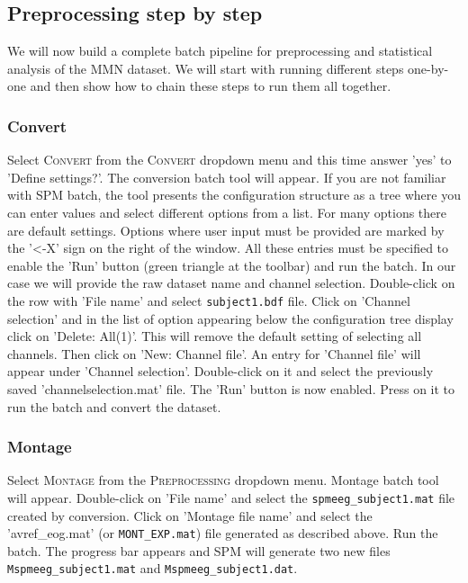 \subsection{Preprocessing step by step}

We will now build a complete batch pipeline for preprocessing and statistical analysis of the MMN dataset. We will start with running different steps one-by-one and then show how to chain these steps to run them all together.

\subsubsection{Convert}
Select \textsc{Convert} from the \textsc{Convert} dropdown menu and this time answer 'yes' to 'Define settings?'. The conversion batch tool will appear. If you are not familiar with SPM batch, the tool presents the configuration structure as a tree where you can enter values and select different options from a list. For many options there are default settings. Options where user input must be provided are marked by the '<-X' sign on the right of the window. All these entries must be specified to enable the 'Run' button (green triangle at the toolbar) and run the batch. In our case we will provide the raw dataset name and channel selection. Double-click on the row with 'File name' and select \texttt{subject1.bdf} file. Click on 'Channel selection' and in the list of option appearing below the configuration tree display click on 'Delete: All(1)'. This will remove the default setting of selecting all channels. Then click on 'New: Channel file'. An entry for 'Channel file' will appear under 'Channel selection'. Double-click on it and select the previously saved 'channelselection.mat' file. The 'Run' button is now enabled. Press on it to run the batch and convert the dataset.

\subsubsection{Montage}
Select \textsc{Montage} from the \textsc{Preprocessing} dropdown menu. Montage batch tool will appear. Double-click on 'File name' and select the \texttt{spmeeg\_subject1.mat} file created by conversion. Click on 'Montage file name' and select the  'avref_eog.mat' (or \texttt{MONT\_EXP.mat}) file generated as described above. Run the batch. The progress bar appears and SPM will generate two new files \texttt{Mspmeeg\_subject1.mat} and \texttt{Mspmeeg\_subject1.dat}.

